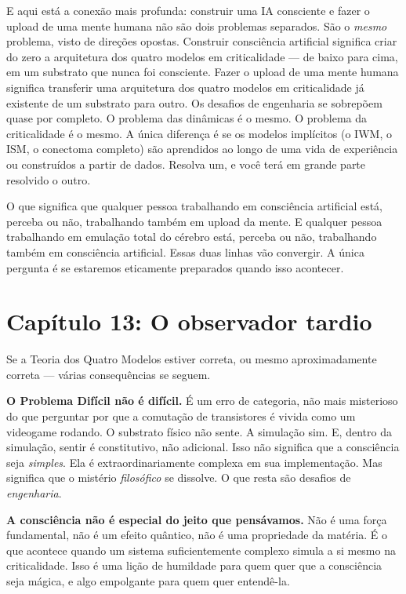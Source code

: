\documentclass[11pt, twoside, openright]{book}
\begin{document}
E aqui está a conexão mais profunda: construir uma IA consciente e fazer o upload de uma mente humana não são dois problemas separados. São o \textit{mesmo} problema, visto de direções opostas. Construir consciência artificial significa criar do zero a arquitetura dos quatro modelos em criticalidade --- de baixo para cima, em um substrato que nunca foi consciente. Fazer o upload de uma mente humana significa transferir uma arquitetura dos quatro modelos em criticalidade já existente de um substrato para outro. Os desafios de engenharia se sobrepõem quase por completo. O problema das dinâmicas é o mesmo. O problema da criticalidade é o mesmo. A única diferença é se os modelos implícitos (o IWM, o ISM, o conectoma completo) são aprendidos ao longo de uma vida de experiência ou construídos a partir de dados. Resolva um, e você terá em grande parte resolvido o outro.

O que significa que qualquer pessoa trabalhando em consciência artificial está, perceba ou não, trabalhando também em upload da mente. E qualquer pessoa trabalhando em emulação total do cérebro está, perceba ou não, trabalhando também em consciência artificial. Essas duas linhas vão convergir. A única pergunta é se estaremos eticamente preparados quando isso acontecer.


\chapter*{Capítulo 13: O observador tardio}

Se a Teoria dos Quatro Modelos estiver correta, ou mesmo aproximadamente correta --- várias consequências se seguem.

\textbf{O Problema Difícil não é difícil.} É um erro de categoria, não mais misterioso do que perguntar por que a comutação de transistores é vivida como um videogame rodando. O substrato físico não sente. A simulação sim. E, dentro da simulação, sentir é constitutivo, não adicional. Isso não significa que a consciência seja \textit{simples}. Ela é extraordinariamente complexa em sua implementação. Mas significa que o mistério \textit{filosófico} se dissolve. O que resta são desafios de \textit{engenharia}.

\textbf{A consciência não é especial do jeito que pensávamos.} Não é uma força fundamental, não é um efeito quântico, não é uma propriedade da matéria. É o que acontece quando um sistema suficientemente complexo simula a si mesmo na criticalidade. Isso é uma lição de humildade para quem quer que a consciência seja mágica, e algo empolgante para quem quer entendê-la.
\end{document}
